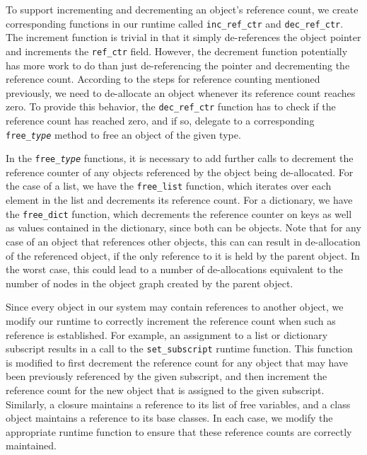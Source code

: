 \documentclass{sigplanconf}
\begin{document}
To support incrementing and decrementing an object's reference count, we create corresponding functions in our runtime called \texttt{inc\_ref\_ctr} and \texttt{dec\_ref\_ctr}.  The increment function is trivial in that it simply de-references the object pointer and increments the \texttt{ref\_ctr} field.   However, the decrement function potentially has more work to do than just de-referencing the pointer and decrementing the reference count.  According to the steps for reference counting mentioned previously, we need to de-allocate an object whenever its reference count reaches zero.  To provide this behavior, the \texttt{dec\_ref\_ctr} function has to check if the reference count has reached zero, and if so, delegate to a corresponding \texttt{free\_\textit{type}} method to free an object of the given type.

In the \texttt{free\_\textit{type}} functions, it is necessary to add further calls to decrement the reference counter of any objects referenced by the object being de-allocated.  For the case of a list, we have the \texttt{free\_list} function, which iterates over each element in the list and decrements its reference count.  For a dictionary, we have the \texttt{free\_dict} function, which decrements the reference counter on keys as well as values contained in the dictionary, since both can be objects.  Note that for any case of an object that references other objects, this can can result in de-allocation of the referenced object, if the only reference to it is held by the parent object.  In the worst case, this could lead to a number of de-allocations equivalent to the number of nodes in the object graph created by the parent object.  

Since every object in our system may contain references to another object, we modify our runtime to correctly increment the reference count when such as reference is established.  For example, an assignment to a list or dictionary subscript results in a call to the \texttt{set\_subscript} runtime function.  This function is modified to first decrement the reference count for any object that may have been previously referenced by the given subscript, and then increment the reference count for the new object that is assigned to the given subscript.  Similarly, a closure maintains a reference to its list of free variables, and a class object maintains a reference to its base classes.  In each case, we modify the appropriate runtime function to ensure that these reference counts are correctly maintained.  
\end{document}
